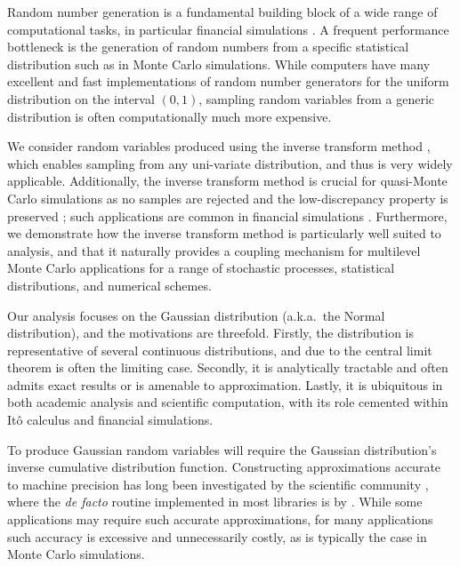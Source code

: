 \documentclass[9pt,a4paper,english]{extarticle}
\begin{document}
Random number generation is a fundamental building block of a wide range of computational tasks, in particular financial simulations \citep{glasserman2013monte,asmussen2007stochastic,joy1996quasi,xu2015high}. A frequent performance bottleneck is the generation of random numbers from a specific statistical distribution such as in Monte Carlo simulations.  While computers have many excellent and fast implementations of random number generators for the uniform distribution on the interval $(0,1)$, sampling random variables from a generic distribution is often computationally much more expensive.

We consider random variables produced using the inverse transform method \citep{glasserman2013monte}, which enables sampling from any uni-variate distribution, and thus is very widely applicable. Additionally, the inverse transform method is crucial for quasi-Monte Carlo simulations \citep{giles2009multilevel_qmc,lecuyer2016randomized} as no samples are rejected and the low-discrepancy property is preserved \citep{tezuka1995uniform}; such applications are common in financial simulations \citep{joy1996quasi,xu2015high}. Furthermore, we demonstrate how the inverse transform method is particularly well suited to analysis, and that it naturally provides a coupling mechanism for multilevel Monte Carlo applications for a range of stochastic processes, statistical distributions, and numerical schemes. 

Our analysis focuses on the Gaussian distribution (a.k.a.\ the Normal distribution), and the motivations are threefold. Firstly, the distribution is representative of several continuous distributions, and due to the central limit theorem is often the limiting case. Secondly, it is analytically tractable and often admits exact results or is amenable to approximation. Lastly, it is ubiquitous in both academic analysis and scientific computation, with its role cemented within It\^{o} calculus and financial simulations. 

To produce Gaussian random variables will require the Gaussian distribution's inverse cumulative distribution function. Constructing approximations accurate to machine precision has long been investigated by the scientific community \citep{hastings1955approximations,evans1974algorithm70,beasley1985percentage,wichura1988algorithm,marsaglia1994rapid,giles2011approximating}, where the \textit{de facto} routine implemented in most libraries is by \citet{wichura1988algorithm}. While some applications may require such accurate approximations, for many applications such accuracy is excessive and unnecessarily costly, as is typically the case in Monte Carlo simulations. 
\end{document}
